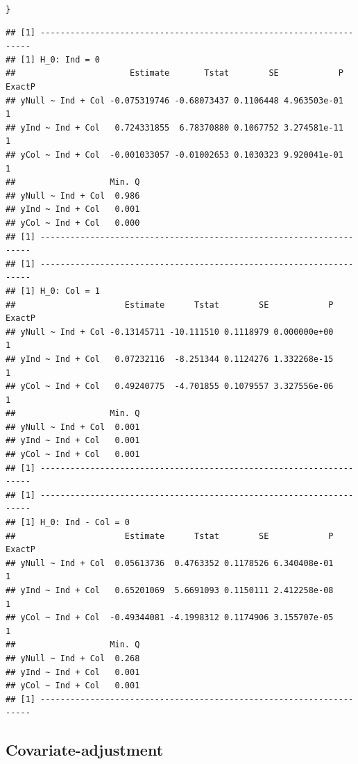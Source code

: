 \documentclass[11pt, a4paper]{article}\usepackage[]{graphicx}\usepackage[]{color}
\makeatletter
\newcommand{\hlstd}[1]{\textcolor[rgb]{0.345,0.345,0.345}{#1}}%
\newenvironment{kframe}{%
 \def\at@end@of@kframe{}%
 \ifinner\ifhmode%
  \def\at@end@of@kframe{\end{minipage}}%
  \begin{minipage}{\columnwidth}%
 \fi\fi%
 \def\FrameCommand##1{\hskip\@totalleftmargin \hskip-\fboxsep
 \colorbox{shadecolor}{##1}\hskip-\fboxsep
     \hskip-\linewidth \hskip-\@totalleftmargin \hskip\columnwidth}%
 \MakeFramed {\advance\hsize-\width
   \@totalleftmargin\z@ \linewidth\hsize
   \@setminipage}}%
 {\par\unskip\endMakeFramed%
 \at@end@of@kframe}
\newenvironment{knitrout}{}{} %
\makeatother
\begin{document}
\begin{knitrout}
\begin{kframe}
\begin{alltt}
    \hlstd{\}}
\end{alltt}
\begin{verbatim}
## [1] --------------------------------------------------------------------
## [1] H_0: Ind = 0
##                       Estimate       Tstat        SE            P ExactP
## yNull ~ Ind + Col -0.075319746 -0.68073437 0.1106448 4.963503e-01      1
## yInd ~ Ind + Col   0.724331855  6.78370880 0.1067752 3.274581e-11      1
## yCol ~ Ind + Col  -0.001033057 -0.01002653 0.1030323 9.920041e-01      1
##                   Min. Q
## yNull ~ Ind + Col  0.986
## yInd ~ Ind + Col   0.001
## yCol ~ Ind + Col   0.000
## [1] --------------------------------------------------------------------
## [1] --------------------------------------------------------------------
## [1] H_0: Col = 1
##                      Estimate      Tstat        SE            P ExactP
## yNull ~ Ind + Col -0.13145711 -10.111510 0.1118979 0.000000e+00      1
## yInd ~ Ind + Col   0.07232116  -8.251344 0.1124276 1.332268e-15      1
## yCol ~ Ind + Col   0.49240775  -4.701855 0.1079557 3.327556e-06      1
##                   Min. Q
## yNull ~ Ind + Col  0.001
## yInd ~ Ind + Col   0.001
## yCol ~ Ind + Col   0.001
## [1] --------------------------------------------------------------------
## [1] --------------------------------------------------------------------
## [1] H_0: Ind - Col = 0
##                      Estimate      Tstat        SE            P ExactP
## yNull ~ Ind + Col  0.05613736  0.4763352 0.1178526 6.340408e-01      1
## yInd ~ Ind + Col   0.65201069  5.6691093 0.1150111 2.412258e-08      1
## yCol ~ Ind + Col  -0.49344081 -4.1998312 0.1174906 3.155707e-05      1
##                   Min. Q
## yNull ~ Ind + Col  0.268
## yInd ~ Ind + Col   0.001
## yCol ~ Ind + Col   0.001
## [1] --------------------------------------------------------------------
\end{verbatim}
\end{kframe}
\end{knitrout}

    \subsection{Covariate-adjustment}
\end{document}
